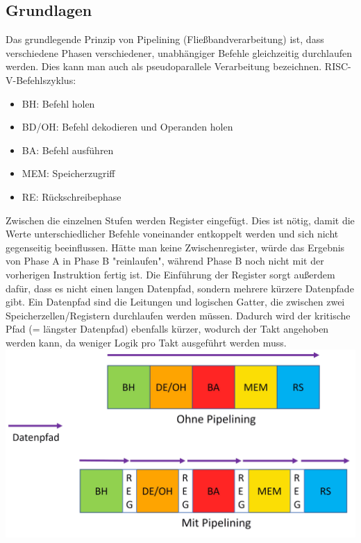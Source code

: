 	\subsection{Grundlagen}
		Das grundlegende Prinzip von Pipelining (Fließbandverarbeitung) ist, dass verschiedene Phasen verschiedener, unabhängiger Befehle gleichzeitig durchlaufen werden. Dies kann man auch als pseudoparallele Verarbeitung bezeichnen. \newline \newline
		RISC-V-Befehlszyklus: \newline
		\begin{itemize}
			\item BH: Befehl holen
			\item BD/OH: Befehl dekodieren und Operanden holen
			\item BA: Befehl ausführen
			\item MEM: Speicherzugriff
			\item RE: Rückschreibephase
		\end{itemize}
		Zwischen die einzelnen Stufen werden Register eingefügt. Dies ist nötig, damit die Werte unterschiedlicher Befehle voneinander entkoppelt werden und sich nicht gegenseitig beeinflussen. Hätte man keine Zwischenregister, würde das Ergebnis von Phase A in Phase B "reinlaufen", während Phase B noch nicht mit der vorherigen Instruktion fertig ist. \newline \newline
		Die Einführung der Register sorgt außerdem dafür, dass es nicht einen langen Datenpfad, sondern mehrere kürzere Datenpfade gibt. Ein Datenpfad sind die Leitungen und logischen Gatter, die zwischen zwei Speicherzellen/Registern durchlaufen werden müssen. 
		Dadurch wird der kritische Pfad (= längster Datenpfad) ebenfalls kürzer, wodurch der Takt angehoben werden kann, da weniger Logik pro Takt ausgeführt werden muss. \newline \newline
		\includegraphics[scale=0.6]{Datenpfade_mit_und_ohne_Pipeline.png}
